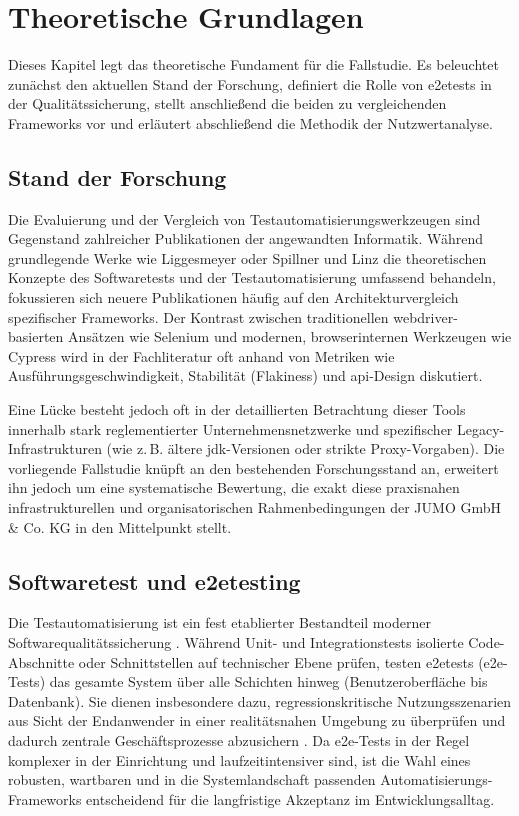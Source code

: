 \section{Theoretische Grundlagen}

Dieses Kapitel legt das theoretische Fundament für die Fallstudie. Es beleuchtet zunächst den aktuellen Stand der Forschung, definiert die Rolle von \gls{e2etests} in der Qualitätssicherung, stellt anschließend die beiden zu vergleichenden Frameworks vor und erläutert abschließend die Methodik der Nutzwertanalyse.

\subsection{Stand der Forschung}
Die Evaluierung und der Vergleich von Testautomatisierungswerkzeugen sind Gegenstand zahlreicher Publikationen der angewandten Informatik. Während grundlegende Werke wie Liggesmeyer \cite{Liggesmeyer2009}oder Spillner und Linz \cite{spillner2024basiswissen} die theoretischen Konzepte des Softwaretests und der Testautomatisierung umfassend behandeln, fokussieren sich neuere Publikationen häufig auf den Architekturvergleich spezifischer Frameworks. Der Kontrast zwischen traditionellen \gls{webdriver}-basierten Ansätzen wie Selenium und modernen, browserinternen Werkzeugen wie Cypress wird in der Fachliteratur oft anhand von Metriken wie Ausführungsgeschwindigkeit, Stabilität (Flakiness) und \gls{api}-Design diskutiert. 

Eine Lücke besteht jedoch oft in der detaillierten Betrachtung dieser Tools innerhalb stark reglementierter Unternehmensnetzwerke und spezifischer Legacy-Infrastrukturen (wie z.\,B. ältere \gls{jdk}-Versionen oder strikte Proxy-Vorgaben). Die vorliegende Fallstudie knüpft an den bestehenden Forschungsstand an, erweitert ihn jedoch um eine systematische Bewertung, die exakt diese praxisnahen infrastrukturellen und organisatorischen Rahmenbedingungen der JUMO GmbH \& Co. KG in den Mittelpunkt stellt.

\subsection{Softwaretest und \gls{e2etest}ing}
Die Testautomatisierung ist ein fest etablierter Bestandteil moderner Softwarequalitätssicherung \cite{Liggesmeyer2009}\cite{spillner2024basiswissen}. Während Unit- und Integrationstests isolierte Code-Abschnitte oder Schnittstellen auf technischer Ebene prüfen, testen \gls{e2etests} (\gls{e2e}-Tests) das gesamte System über alle Schichten hinweg (Benutzeroberfläche bis Datenbank). Sie dienen insbesondere dazu, regressionskritische Nutzungsszenarien aus Sicht der Endanwender in einer realitätsnahen Umgebung zu überprüfen und dadurch zentrale Geschäftsprozesse abzusichern \cite{spillner2024basiswissen}. Da \gls{e2e}-Tests in der Regel komplexer in der Einrichtung und laufzeitintensiver sind, ist die Wahl eines robusten, wartbaren und in die Systemlandschaft passenden Automatisierungs-Frameworks entscheidend für die langfristige Akzeptanz im Entwicklungsalltag.

